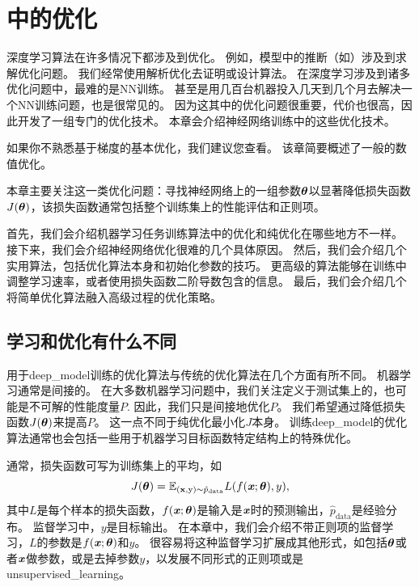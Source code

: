 \chapter{中的优化}
\label{chap:optimization_for_training_deep_models}
深度学习算法在许多情况下都涉及到优化。
例如，模型中的推断（如）涉及到求解优化问题。
我们经常使用解析优化去证明或设计算法。
在深度学习涉及到诸多优化问题中，最难的是\gls{NN}训练。
甚至是用几百台机器投入几天到几个月去解决一个\gls{NN}训练问题，也是很常见的。
因为这其中的优化问题很重要，代价也很高，因此开发了一组专门的优化技术。
本章会介绍神经网络训练中的这些优化技术。

如果你不熟悉基于梯度的基本优化，我们建议您查看。
该章简要概述了一般的数值优化。

本章主要关注这一类优化问题：寻找神经网络上的一组参数$\boldsymbol{\theta}$以显著降低损失函数$J(\boldsymbol{\theta})$，该损失函数通常包括整个训练集上的性能评估和正则项。

首先，我们会介绍机器学习任务训练算法中的优化和纯优化在哪些地方不一样。
接下来，我们会介绍神经网络优化很难的几个具体原因。
然后，我们会介绍几个实用算法，包括优化算法本身和初始化参数的技巧。
更高级的算法能够在训练中调整学习速率，或者使用损失函数二阶导数包含的信息。
最后，我们会介绍几个将简单优化算法融入高级过程的优化策略。


\section{学习和优化有什么不同}
\label{sec:how_learning_differs_from_pure_optimization}
用于\gls{deep_model}训练的优化算法与传统的优化算法在几个方面有所不同。
机器学习通常是间接的。
在大多数机器学习问题中，我们关注定义于测试集上的，也可能是不可解的性能度量$P$.
因此，我们只是间接地优化$P$。
我们希望通过降低损失函数$J(\boldsymbol{\theta})$来提高$P$。
这一点不同于纯优化最小化$J$本身。
训练\gls{deep_model}的优化算法通常也会包括一些用于机器学习目标函数特定结构上的特殊优化。

通常，损失函数可写为训练集上的平均，如
\begin{equation}
\label{eq:8.1}
    J(\boldsymbol{\theta}) = \mathbb{E}_{(\mathbf{x}, \mathrm{y}) \sim\hat{p}_\text{data}} L(f(\boldsymbol{\mathit{x}} ; \boldsymbol{\theta}), y),
\end{equation}
其中$L$是每个样本的损失函数，$f(\boldsymbol{\mathit{x}};\boldsymbol{\theta})$是输入是$\boldsymbol{\mathit{x}}$时的预测输出，$\hat{p}_{\text{data}}$是经验分布。
监督学习中，$y$是目标输出。
在本章中，我们会介绍不带正则项的监督学习，$L$的参数是$f(\boldsymbol{\mathit{x}};\boldsymbol{\theta})$和$y$。
很容易将这种监督学习扩展成其他形式，如包括$\boldsymbol{\theta}$或者$\boldsymbol{\mathit{x}}$做参数，或是去掉参数$y$，以发展不同形式的正则项或是\gls{unsupervised_learning}。

